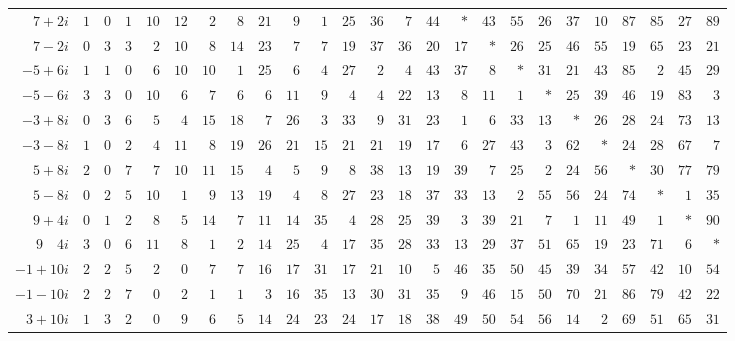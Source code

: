 \begin{longtable}{@{}r|r|r|r|r|r|r|r|r|r|r|r|r|r|r|r|r|r|r|r|r|r|r|r|r@{}}
$7+2i$ & $1$ & $0$ & $1$ & $10$ & $12$ & $2$ & $8$ & $21$ & $9$ & $1$ & $25$ & $36$ & $7$ & $44$ & $\ast$ & $43$ & $55$ & $26$ & $37$ & $10$ & $87$ & $85$ & $27$ & $89$\\
$7-2i$ & $0$ & $3$ & $3$ & $2$ & $10$ & $8$ & $14$ & $23$ & $7$ & $7$ & $19$ & $37$ & $36$ & $20$ & $17$ & $\ast$ & $26$ & $25$ & $46$ & $55$ & $19$ & $65$ & $23$ & $21$\\
$-5+6i$ & $1$ & $1$ & $0$ & $6$ & $10$ & $10$ & $1$ & $25$ & $6$ & $4$ & $27$ & $2$ & $4$ & $43$ & $37$ & $8$ & $\ast$ & $31$ & $21$ & $43$ & $85$ & $2$ & $45$ & $29$\\
$-5-6i$ & $3$ & $3$ & $0$ & $10$ & $6$ & $7$ & $6$ & $6$ & $11$ & $9$ & $4$ & $4$ & $22$ & $13$ & $8$ & $11$ & $1$ & $\ast$ & $25$ & $39$ & $46$ & $19$ & $83$ & $3$\\
$-3+8i$ & $0$ & $3$ & $6$ & $5$ & $4$ & $15$ & $18$ & $7$ & $26$ & $3$ & $33$ & $9$ & $31$ & $23$ & $1$ & $6$ & $33$ & $13$ & $\ast$ & $26$ & $28$ & $24$ & $73$ & $13$\\
$-3-8i$ & $1$ & $0$ & $2$ & $4$ & $11$ & $8$ & $19$ & $26$ & $21$ & $15$ & $21$ & $21$ & $19$ & $17$ & $6$ & $27$ & $43$ & $3$ & $62$ & $\ast$ & $24$ & $28$ & $67$ & $7$\\
$5+8i$ & $2$ & $0$ & $7$ & $7$ & $10$ & $11$ & $15$ & $4$ & $5$ & $9$ & $8$ & $38$ & $13$ & $19$ & $39$ & $7$ & $25$ & $2$ & $24$ & $56$ & $\ast$ & $30$ & $77$ & $79$\\
$5-8i$ & $0$ & $2$ & $5$ & $10$ & $1$ & $9$ & $13$ & $19$ & $4$ & $8$ & $27$ & $23$ & $18$ & $37$ & $33$ & $13$ & $2$ & $55$ & $56$ & $24$ & $74$ & $\ast$ & $1$ & $35$\\
$9+4i$ & $0$ & $1$ & $2$ & $8$ & $5$ & $14$ & $7$ & $11$ & $14$ & $35$ & $4$ & $28$ & $25$ & $39$ & $3$ & $39$ & $21$ & $7$ & $1$ & $11$ & $49$ & $1$ & $\ast$ & $90$\\
$9\quad4i$ & $3$ & $0$ & $6$ & $11$ & $8$ & $1$ & $2$ & $14$ & $25$ & $4$ & $17$ & $35$ & $28$ & $33$ & $13$ & $29$ & $37$ & $51$ & $65$ & $19$ & $23$ & $71$ & $6$ & $\ast$\\
$-1+10i$ & $2$ & $2$ & $5$ & $2$ & $0$ & $7$ & $7$ & $16$ & $17$ & $31$ & $17$ & $21$ & $10$ & $5$ & $46$ & $35$ & $50$ & $45$ & $39$ & $34$ & $57$ & $42$ & $10$ & $54$\\
$-1-10i$ & $2$ & $2$ & $7$ & $0$ & $2$ & $1$ & $1$ & $3$ & $16$ & $35$ & $13$ & $30$ & $31$ & $35$ & $9$ & $46$ & $15$ & $50$ & $70$ & $21$ & $86$ & $79$ & $42$ & $22$\\
$3+10i$ & $1$ & $3$ & $2$ & $0$ & $9$ & $6$ & $5$ & $14$ & $24$ & $23$ & $24$ & $17$ & $18$ & $38$ & $49$ & $50$ & $54$ & $56$ & $14$ & $2$ & $69$ & $51$ & $65$ & $31$\\

\end{longtable}
